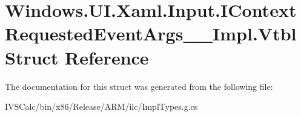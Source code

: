 \hypertarget{struct_windows_1_1_u_i_1_1_xaml_1_1_input_1_1_i_context_requested_event_args_____impl_1_1_vtbl}{}\section{Windows.\+U\+I.\+Xaml.\+Input.\+I\+Context\+Requested\+Event\+Args\+\_\+\+\_\+\+Impl.\+Vtbl Struct Reference}
\label{struct_windows_1_1_u_i_1_1_xaml_1_1_input_1_1_i_context_requested_event_args_____impl_1_1_vtbl}


The documentation for this struct was generated from the following file\+:\begin{DoxyCompactItemize}
\item 
I\+V\+S\+Calc/bin/x86/\+Release/\+A\+R\+M/ilc/Impl\+Types.\+g.\+cs\end{DoxyCompactItemize}

